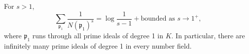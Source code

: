 For $s > 1$,
$$\sum_{\mathfrak{p}_1} \frac{1}{N(\mathfrak{p}_1)^s} = \log\frac{1}{s-1} + \text{bounded as } s \to 1^+,$$
where $\mathfrak{p}_1$ runs through all prime ideals of degree 1 in $K$. In particular, there are infinitely many prime ideals of degree 1 in every number field.
